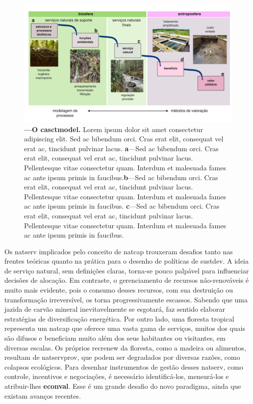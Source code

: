 \documentclass[./main.tex]{subfiles}
\begin{document}
\begin{figure}[t!] 
\centering				
\includegraphics[width=0.98\linewidth]{figs/fig_cascade.jpg}		
\caption[O \gls{model} de cascata de serviços naturais]
{\textbf{---\;O \gls{casctmodel}.}
    Lorem ipsum dolor sit amet consectetur adipiscing elit. Sed ac bibendum orci. Cras erat elit, consequat vel erat ac, tincidunt pulvinar lacus. \;\textbf{a}\;---\;Sed ac bibendum orci. Cras erat elit, consequat vel erat ac, tincidunt pulvinar lacus. Pellentesque vitae consectetur quam. Interdum et malesuada fames ac ante ipsum primis in faucibus.\;\textbf{b}\;---\;Sed ac bibendum orci. Cras erat elit, consequat vel erat ac, tincidunt pulvinar lacus. Pellentesque vitae consectetur quam. Interdum et malesuada fames ac ante ipsum primis in faucibus. \;\textbf{c}\;---\;Sed ac bibendum orci. Cras erat elit, consequat vel erat ac, tincidunt pulvinar lacus. Pellentesque vitae consectetur quam. Interdum et malesuada fames ac ante ipsum primis in faucibus.
}
\label{fig:eco:cascade} 		
\end{figure}

\par Os \gls{natserv} implicados pelo conceito de \gls{natcap} trouxeram desafios tanto nas frentes teóricas quanto na prática para o desenho de políticas de \gls{sustdev}. A ideia de serviço natural, sem definições claras, torna-se pouco palpável para influenciar decisões de alocação. Em contraste, o gerenciamento de recursos não-renováveis é muito mais evidente, pois o consumo desses recursos, com sua destruição ou transformação irreversível, os torna progressivamente escassos. Sabendo que uma jazida de carvão mineral inevitavelmente se esgotará, faz sentido elaborar estratégias de diversificação energética. Por outro lado, uma floresta tropical representa um \gls{natcap} que oferece uma vasta gama de serviços, muitos dos quais são difusos e beneficiam muito além dos seus habitantes ou visitantes, em diversas escalas. Os próprios \gls{recrenew} da floresta, como a madeira ou alimentos, resultam de \gls{natservprov}, que podem ser degradados por diversas razões, como colapsos ecológicos. Para desenhar instrumentos de gestão desses \gls{natserv}, como controle, incentivos e negociações, é necessário identificá-los, mensurá-los e atribuir-lhes \textbf{\gls{econval}}. Esse é um grande desafio do novo \gls{paradigma}, ainda que existam avanços recentes.
\end{document}
